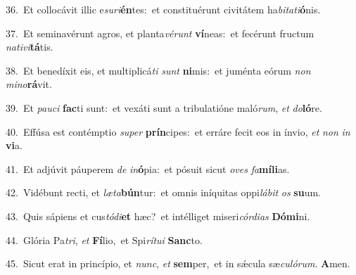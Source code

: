 {\numbfont\textcolor{\numbcolor}{36.}}~Et collocávit illic e\-\textit{su}\-\textit{ri}\textbf{én}tes:~\star et constituérunt civitátem ha\-\textit{bi}\-\textit{ta}\textit{ti}\textbf{ó}nis.\par
{\numbfont\textcolor{\numbcolor}{37.}}~Et seminavérunt agros, et planta\-\textit{vé}\-\textit{runt} \textbf{ví}\-neas:~\star et fecérunt fructum \textit{na}\-\textit{ti}\textit{vi}\textbf{tá}tis.\par
{\numbfont\textcolor{\numbcolor}{38.}}~Et benedíxit eis, et multiplicá\textit{ti} \textit{sunt} \textbf{ni}\-mis:~\star et juménta eórum \textit{non} \textit{mi}\-\textit{no}\textbf{rá}vit.\par
{\numbfont\textcolor{\numbcolor}{39.}}~Et \textit{pau}\-\textit{ci} \textbf{fac}\-ti sunt:~\star et vexáti sunt a tribulatióne maló\-\textit{rum}\-, \textit{et} \textit{do}\-\textbf{ló}re.\par
{\numbfont\textcolor{\numbcolor}{40.}}~Effúsa est contémptio \textit{su}\-\textit{per} \textbf{prín}\-cipes:~\star et erráre fecit eos in ínvio, \textit{et} \textit{non} \textit{in} \textbf{vi}\-a.\par
{\numbfont\textcolor{\numbcolor}{41.}}~Et adjúvit páuperem \textit{de} \textit{in}\-\textbf{ó}pia:~\star et pósuit sicut \textit{o}\-\textit{ves} \textit{fa}\-\textbf{mí}\textbf{li}as.\par
{\numbfont\textcolor{\numbcolor}{42.}}~Vidébunt recti, et \textit{læ}\-\textit{ta}\textbf{bún}tur:~\star et omnis iníquitas oppi\-\textit{lá}\-\textit{bit} \textit{os} \textbf{su}\-um.\par
{\numbfont\textcolor{\numbcolor}{43.}}~Quis sápiens et cus\-\textit{tó}\-\textit{di}\textbf{et} hæc?~\star et intélliget miseri\-\textit{cór}\-\textit{di}\textit{as} \textbf{Dó}\-\textbf{mi}ni.\par
{\numbfont\textcolor{\numbcolor}{44.}}~Glória Pa\-\textit{tri}\-, \textit{et} \textbf{Fí}\-lio,~\star et Spi\-\textit{rí}\-\textit{tu}\textit{i} \textbf{Sanc}\-to.\par
{\numbfont\textcolor{\numbcolor}{45.}}~Sicut erat in princípio, et \textit{nunc}\-, \textit{et} \textbf{sem}\-per,~\star et in sǽcula sæ\-\textit{cu}\-\textit{ló}\textit{rum}. \textbf{A}\-men.\par

